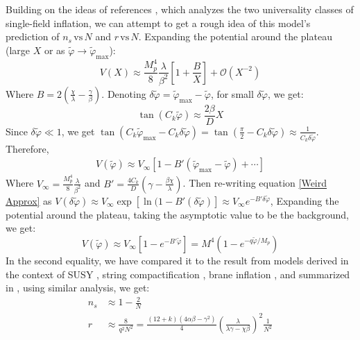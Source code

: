 \documentclass[aps,prd,reprint,preprintnumbers,showpacs,floatfix,nofootinbib,superscript address]{revtex4-2}
\begin{document}
Building on the ideas of references \cite{fairbairn_radion_2003, roest_universality_2014}, which analyzes the two universality classes of single-field inflation, we can attempt to get a rough idea of this model's prediction of $n_s \, \text{vs} \, N$ and $r \, \text{vs} \, N$.
Expanding the potential around the plateau (large $X$ or as $\tilde{\varphi} \rightarrow \tilde{\varphi}_{\text{max}}$):
\begin{equation}
    V(X) \approx \frac{M_p^4}{8} \frac{\lambda}{\beta^2}\left[1 + \frac{B}{X}\right] + \mathcal{O}(X^{-2})
\end{equation}
Where $B = 2(\frac{\chi}{\lambda} - \frac{\gamma}{\beta})$. Denoting $\delta \tilde{\varphi} =  \tilde{\varphi}_{\text{max}} - \tilde{\varphi}$, for small $\delta \tilde{\varphi}$, we get:
\begin{equation}
    \tan(C_k \tilde{\varphi}) \approx \frac{2\beta}{D}X
\end{equation}
Since $\delta \tilde{\varphi} \ll 1$, we get $\tan(C_k \tilde{\varphi}_{\text{max}} - C_k\delta\tilde{\varphi}) = \tan(\frac{\pi}{2} - C_k\delta\tilde{\varphi}) \approx \frac{1}{C_k \delta \tilde{\varphi}}$. Therefore, 
\begin{align} \label{Weird Approx}
    V(\tilde{\varphi}) \approx V_{\infty}[1 - B'(\tilde{\varphi}_{\text{max}} - \tilde{\varphi}) + \cdots]
\end{align}
Where $V_\infty = \frac{M_p^4}{8} \frac{\lambda}{\beta^2}$ and $B' = \frac{4C_k}{D} (\gamma-\frac{\beta\chi}{\lambda})$. Then re-writing equation \ref{Weird Approx} as $V(\delta\tilde{\varphi}) \approx V_{\infty} \exp{[\ln(1 - B'(\delta \tilde{\varphi})]} \approx V_\infty e^{-B'\delta \tilde{\varphi}}$, Expanding the potential around the plateau, taking the asymptotic value to be the background, we get:
\begin{equation}
    V(\tilde{\varphi}) \approx V_\infty [1 - e^{-B' \tilde{\varphi}} ] = M^4 (1 - e^{-q\tilde{\varphi}/M_p})
\end{equation}
In the second equality, we have compared it to the result from models derived in the context of SUSY \cite{stewart_inflation_1995}, string compactification \cite{cicoli_fibre_2009}, brane inflation \cite{dvali_brane_1999}, and summarized in \cite{martin_encyclopaedia_2014}, using similar analysis, we get:
\begin{align}
    n_s &\approx 1 - \frac{2}{N} \\
    r &\approx \frac{8}{q^2N^2} = \frac{(12+k)(4\alpha\beta - \gamma^2)}{4} \left(\frac{\lambda}{\lambda \gamma - \chi \beta} \right)^2 \frac{1}{N^2} 
\end{align}
\end{document}
